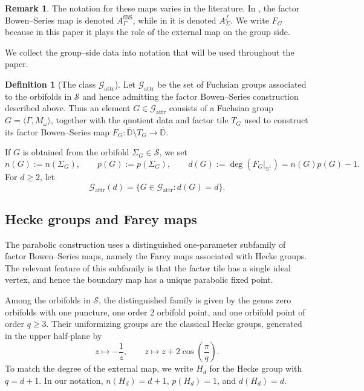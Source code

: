 \documentclass[11pt,a4paper, oneside]{amsart}
\theoremstyle{definition}
\newtheorem{defn}[thm]{Definition}
\newtheorem{rem}[thm]{Remark}
\theoremstyle{remark}
\numberwithin{equation}{section}
\def\D{{\mathbb{D}}}
\renewcommand{\ge}{\geqslant}
\newcommand{\attr}{{\text{attr}}}
\newcommand{\Circle}{{{\mathbb S}^1}}
\begin{document}
\begin{rem}
	The notation for these maps varies in the literature.  In \cite{MM}, the
	factor Bowen--Series map is denoted $A^{\mathrm{fBS}}_\Gamma$, while in
	\cite[\S13]{LLM24} it is denoted $A^f_\Sigma$.  We write $F_G$ because in
	this paper it plays the role of the external map on the group side.
\end{rem}

We collect the group--side data into notation that will be used throughout the
paper.

\begin{defn}[The class $\mathscr G_{\attr}$]
	\label{Def:Gattr}
	Let $\mathscr G_{\attr}$ be the set of Fuchsian groups associated to the orbifolds in $\mathscr S$ and hence admitting the factor Bowen--Series construction described above. Thus an element $G\in\mathscr G_{\attr}$ consists of a Fuchsian group
	$G=\langle\Gamma,M_\omega\rangle$, together with the quotient data and factor
	tile $T_G$ used to construct its factor Bowen--Series map
	$F_G:\overline{\D}\setminus T_G\to\overline{\D}$.
	
	If $G$ is obtained from the orbifold $\Sigma_G\in\mathscr S$, we set
	\[
	n(G):=n(\Sigma_G),
	\qquad
	p(G):=p(\Sigma_G),
	\qquad
	d(G):=\deg(F_G|_{\Circle})=n(G)p(G)-1.
	\]
	For $d\ge2$, let
	\[
	\mathscr G_{\attr}(d)
	=
	\{G\in\mathscr G_{\attr}:d(G)=d\}.
	\]
\end{defn}


\subsection{Hecke groups and Farey maps}
\label{SSec:HeckeFarey}

The parabolic construction uses a distinguished one-parameter subfamily of
factor Bowen--Series maps, namely the Farey maps associated with Hecke groups.
The relevant feature of this subfamily is that the factor tile has a single
ideal vertex, and hence the boundary map has a unique parabolic fixed point.


Among the orbifolds in $\mathscr S$, the distinguished family is given by the genus zero orbifolds with one puncture, one order 2 orbifold point, and one orbifold point of
order $q\ge3$.  Their uniformizing groups are the classical Hecke groups,
generated in the upper half-plane by
\[
z \mapsto -\frac1z,
\qquad
z \mapsto z+2\cos\!\left(\frac{\pi}{q}\right).
\]
To match the degree of the external map, we write $H_d$ for the Hecke group with $q = d+1$. In our notation, $n(H_d)=d+1$, $p(H_d)=1$, and $d(H_d)=d$.
\end{document}
